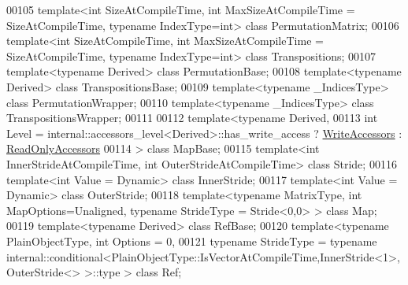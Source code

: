 \begin{DoxyCode}
00105 \textcolor{keyword}{template}<\textcolor{keywordtype}{int} SizeAtCompileTime, \textcolor{keywordtype}{int} MaxSizeAtCompileTime = SizeAtCompileTime, \textcolor{keyword}{typename} IndexType=\textcolor{keywordtype}{int}> \textcolor{keyword}{class
       }PermutationMatrix;
00106 \textcolor{keyword}{template}<\textcolor{keywordtype}{int} SizeAtCompileTime, \textcolor{keywordtype}{int} MaxSizeAtCompileTime = SizeAtCompileTime, \textcolor{keyword}{typename} IndexType=\textcolor{keywordtype}{int}> \textcolor{keyword}{class
       }Transpositions;
00107 \textcolor{keyword}{template}<\textcolor{keyword}{typename} Derived> \textcolor{keyword}{class }PermutationBase;
00108 \textcolor{keyword}{template}<\textcolor{keyword}{typename} Derived> \textcolor{keyword}{class }TranspositionsBase;
00109 \textcolor{keyword}{template}<\textcolor{keyword}{typename} \_IndicesType> \textcolor{keyword}{class }PermutationWrapper;
00110 \textcolor{keyword}{template}<\textcolor{keyword}{typename} \_IndicesType> \textcolor{keyword}{class }TranspositionsWrapper;
00111 
00112 \textcolor{keyword}{template}<\textcolor{keyword}{typename} Derived,
00113          \textcolor{keywordtype}{int} Level = internal::accessors\_level<Derived>::has\_write\_access ? 
      \hyperlink{group__enums_gga9f93eac38eb83deb0e8dbd42ddf11d5da2c59ef3697d65866c3a8e16eda7881ab}{WriteAccessors} : \hyperlink{group__enums_gga9f93eac38eb83deb0e8dbd42ddf11d5da42865f87356ad7e585a1bfbfd1b81699}{ReadOnlyAccessors}
00114 > \textcolor{keyword}{class }MapBase;
00115 \textcolor{keyword}{template}<\textcolor{keywordtype}{int} InnerStr\textcolor{keywordtype}{id}eAtCompileTime, \textcolor{keywordtype}{int} OuterStr\textcolor{keywordtype}{id}eAtCompileTime> \textcolor{keyword}{class }Stride;
00116 \textcolor{keyword}{template}<\textcolor{keywordtype}{int} Value = Dynamic> \textcolor{keyword}{class }InnerStride;
00117 \textcolor{keyword}{template}<\textcolor{keywordtype}{int} Value = Dynamic> \textcolor{keyword}{class }OuterStride;
00118 \textcolor{keyword}{template}<\textcolor{keyword}{typename} MatrixType, \textcolor{keywordtype}{int} MapOptions=Unaligned, \textcolor{keyword}{typename} Str\textcolor{keywordtype}{id}eType = Str\textcolor{keywordtype}{id}e<0,0> > \textcolor{keyword}{class }Map;
00119 \textcolor{keyword}{template}<\textcolor{keyword}{typename} Derived> \textcolor{keyword}{class }RefBase;
00120 \textcolor{keyword}{template}<\textcolor{keyword}{typename} PlainObjectType, \textcolor{keywordtype}{int} Options = 0,
00121          \textcolor{keyword}{typename} StrideType = \textcolor{keyword}{typename} 
      internal::conditional<PlainObjectType::IsVectorAtCompileTime,InnerStride<1>,OuterStride<> >::type > \textcolor{keyword}{class }Ref;

\end{DoxyCode}
